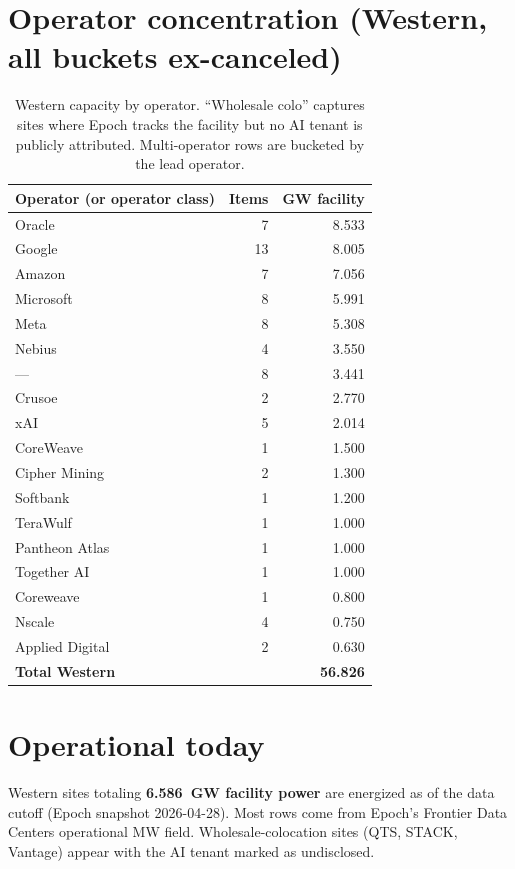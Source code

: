 \documentclass[11pt]{article}
\begin{document}
\section*{Operator concentration (Western, all buckets ex-canceled)}
\begin{table}[h]
\centering\small
\begin{tabular}{@{}lrr@{}}
\toprule
\textbf{Operator (or operator class)} & \textbf{Items} & \textbf{GW facility} \\
\midrule
Oracle & 7 & 8.533 \\
Google & 13 & 8.005 \\
Amazon & 7 & 7.056 \\
Microsoft & 8 & 5.991 \\
Meta & 8 & 5.308 \\
Nebius & 4 & 3.550 \\
— & 8 & 3.441 \\
Crusoe & 2 & 2.770 \\
xAI & 5 & 2.014 \\
CoreWeave & 1 & 1.500 \\
Cipher Mining & 2 & 1.300 \\
Softbank & 1 & 1.200 \\
TeraWulf & 1 & 1.000 \\
Pantheon Atlas & 1 & 1.000 \\
Together AI & 1 & 1.000 \\
Coreweave & 1 & 0.800 \\
Nscale & 4 & 0.750 \\
Applied Digital & 2 & 0.630 \\
\midrule \textbf{Total Western} & & \textbf{56.826} \\
\bottomrule
\end{tabular}
\caption{Western capacity by operator. ``Wholesale colo'' captures sites where Epoch tracks the facility but no AI tenant is publicly attributed. Multi-operator rows are bucketed by the lead operator.}
\end{table}
\section{Operational today}\label{sec:operational}
 Western sites totaling \textbf{6.586~GW facility power} are energized as of the data cutoff (Epoch snapshot 2026-04-28). Most rows come from Epoch's Frontier Data Centers operational MW field. Wholesale-colocation sites (QTS, STACK, Vantage) appear with the AI tenant marked as undisclosed.
\end{document}
